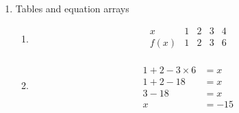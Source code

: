 \documentclass[12pt]{article}
\begin{document}
\begin{enumerate}
    \item Tables and equation arrays
    \begin{enumerate}
        \item 
        \[
        \begin{array}{c|c|c|c|c}
        x & 1 & 2 & 3 & 4 \\
        \hline
        f(x) & 1 & 2 & 3 & 6 \\
        \end{array}
        \]

  \item 
        \begin{align}
        1 + 2 - 3 \times 6 &= x \tag{1}\\
        1 + 2 - 18 &= x \tag{2}\\
        3 - 18 &= x \tag{3}\\
        x &= -15 \tag{4}
        \end{align}
    \end{enumerate}
\end{enumerate}
\end{document}

